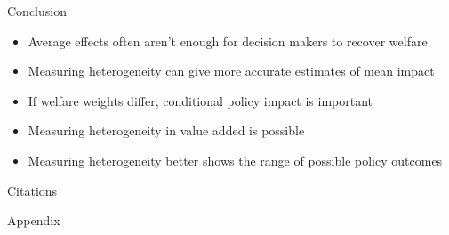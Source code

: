 \documentclass[t,aspectratio=169]{beamer}
\begin{document}
  
\begin{frame}{Conclusion}

    \begin{itemize}
        \vspace{1em}
        \setlength\itemsep{1em}
        \item Average effects often aren't enough for decision makers to recover welfare 
        \item Measuring heterogeneity can give more accurate estimates of mean impact
        \item If welfare weights differ, conditional policy impact is important
        \item Measuring heterogeneity in value added is possible 
        \item Measuring heterogeneity better shows the range of possible policy outcomes

    \end{itemize}
\end{frame}
  
  

\begin{frame}{Citations}


\end{frame}

  

\begin{frame}[noframenumbering]{Appendix}
\label{}

\end{frame}

\end{document}
